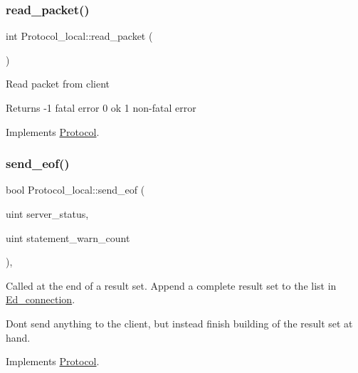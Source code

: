 \subsubsection{\texorpdfstring{read\+\_\+packet()}{read\_packet()}}
{\footnotesize\ttfamily int Protocol\+\_\+local\+::read\+\_\+packet (\begin{DoxyParamCaption}{ }\end{DoxyParamCaption})\hspace{0.3cm}{\ttfamily [virtual]}}

Read packet from client

\begin{DoxyReturn}{Returns}
-\/1 fatal error 0 ok 1 non-\/fatal error 
\end{DoxyReturn}


Implements \mbox{\hyperlink{classProtocol_a864cc6313ff0a75ce7a69dd7c89de4a7}{Protocol}}.

\mbox{\label{classProtocol__local_a1aad5312e410648afe13f0ba3d252e36}} 
\subsubsection{\texorpdfstring{send\+\_\+eof()}{send\_eof()}}
{\footnotesize\ttfamily bool Protocol\+\_\+local\+::send\+\_\+eof (\begin{DoxyParamCaption}\item[{uint}]{server\+\_\+status,  }\item[{uint}]{statement\+\_\+warn\+\_\+count }\end{DoxyParamCaption})\hspace{0.3cm}{\ttfamily [protected]}, {\ttfamily [virtual]}}

Called at the end of a result set. Append a complete result set to the list in \mbox{\hyperlink{classEd__connection}{Ed\+\_\+connection}}.

Don\textquotesingle{}t send anything to the client, but instead finish building of the result set at hand. 

Implements \mbox{\hyperlink{classProtocol_a9a2cc208a15a3a81f99ace4c1009c01d}{Protocol}}.

\mbox{\label{classProtocol__local_a8f024e3c4a806e4e969ec452126f5769}} 
